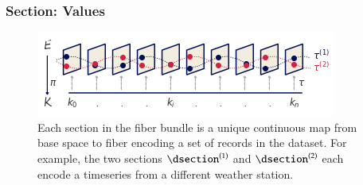 \documentclass[journal]{vgtc}                %
\begin{document}
 \subsubsection{Section: Values}
 \label{sec:math:data:section}
 


 \begin{figure}[htb]
  \centering %
  \includegraphics[width=\columnwidth]{fiberbundle.png}
  \caption{Each section in the fiber bundle is a unique continuous map from base space to fiber encoding a set of records in the dataset. For example, the two sections $\dsection^{(1)}$ and $\dsection^{(2)}$ each encode a timeseries from a different weather station.}
  \label{fig:math:data:section}
 \end{figure}
\end{document}
